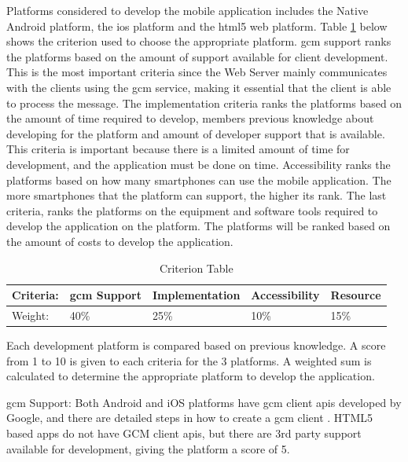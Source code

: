 \documentclass{article}
\begin{document}
\noindent Platforms considered to develop the mobile application includes the Native Android platform, the \gls{ios} platform and the \gls{html5} web platform. Table \ref{tab:criterion-table} below shows the criterion used to choose the appropriate platform. \gls{gcm} support ranks the platforms based on the amount of support available for client development. This is the most important criteria since the Web Server mainly communicates with the clients using the \gls{gcm} service, making it essential that the client is able to process the message. The implementation criteria ranks the platforms based on the amount of time required to develop, members previous knowledge about developing for the platform and amount of developer support that is available. This criteria is important because there is a limited amount of time for development, and the application must be done on time. Accessibility ranks the platforms based on how many smartphones can use the mobile application. The more smartphones that the platform can support, the higher its rank. The last criteria, ranks the platforms on the equipment and software tools required to develop the application on the platform. The platforms will be ranked based on the amount of costs to develop the application.


\begin{table}[H]
\centering
\caption{Criterion Table}
\label{tab:criterion-table}
\begin{tabular}{lllll}
\toprule
\textbf{Criteria:} & \textbf{\gls{gcm} Support} & \textbf{Implementation}  & \textbf{Accessibility} & \textbf{Resource}\\ 
\midrule
Weight:   & 40\%        & 25\%           & 10\%          & 15\%  \\
\bottomrule  
\end{tabular}
\end{table}


Each development platform is compared based on previous knowledge. A score from 1 to 10 is given to each criteria for the 3 platforms. A weighted sum is calculated to determine the appropriate platform to develop the application.

\noindent \gls{gcm} Support: Both Android and iOS platforms have \gls{gcm} client \glspl{api} developed by Google, and there are detailed steps in how to create a \gls{gcm} client \cite{gcm}. HTML5 based apps do not have GCM client \glspl{api}, but there are 3rd party support available for development, giving the platform a score of 5.
\end{document}
